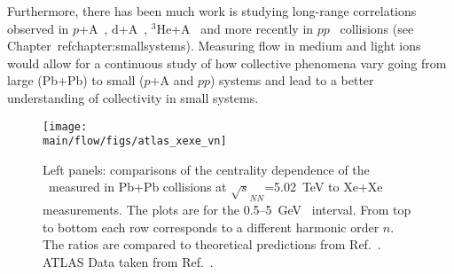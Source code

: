 Furthermore, there has been much work is studying long-range correlations
  observed in $p$+A~\cite{HION-2016-01,CMS:2012qk,Abelev:2012ola,HION-2012-13,HION-2013-04},
  d+A~\cite{Aidala:2017pup}, $^{3}\mathrm{He}$+A~\cite{Adare:2015ctn} 
  and more recently in $pp$~\cite{HION-2015-09,HION-2016-01} collisions 
  (see Chapter~ref{chapter:smallsystems}).
Measuring flow in medium and light ions would allow for a continuous study 
  of how collective phenomena vary going from large (Pb+Pb) to small 
  ($p$+A and $pp$) systems and lead to a better understanding of collectivity
  in small systems.


\begin{figure}[!htb]
\begin{center}
\texttt{[image: \\main/flow/figs/atlas\_xexe\_vn]}
\caption{
Left panels: comparisons of the centrality dependence of the \vn\ measured 
  in Pb+Pb collisions at $\sqrt{s}_{NN}$=5.02~TeV to Xe+Xe measurements. 
The plots are for the 0.5--5~GeV \pT\ interval. 
From top to bottom each row corresponds to a different harmonic order $n$.
The ratios are compared to theoretical predictions from Ref.~\cite{Giacalone:2017dud}.
ATLAS Data taken from Ref.~\cite{ATLAS-CONF-2018-011}.
}
\label{fig:atlas_xexe_vn}
\end{center}
\end{figure}
